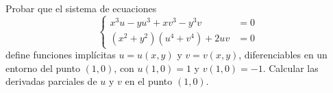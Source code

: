 \begin{ejercicio}
    Probar que el sistema de ecuaciones
    \begin{equation*}
        \left\{
            \begin{array}{ll}
                x^3u - yu^3 + xv^3 - y^3v &= 0 \\
                (x^2+y^2)(u^4+v^4) + 2uv &= 0
            \end{array}
        \right.
    \end{equation*}
    define funciones implícitas $u=u(x,y)$ y $v=v(x,y)$, diferenciables en un entorno
    del punto $(1,0)$, con $u(1,0)=1$ y $v(1,0)=-1$. Calcular las derivadas parciales de $u$ y $v$ en el punto $(1,0)$.\\
\end{ejercicio}



